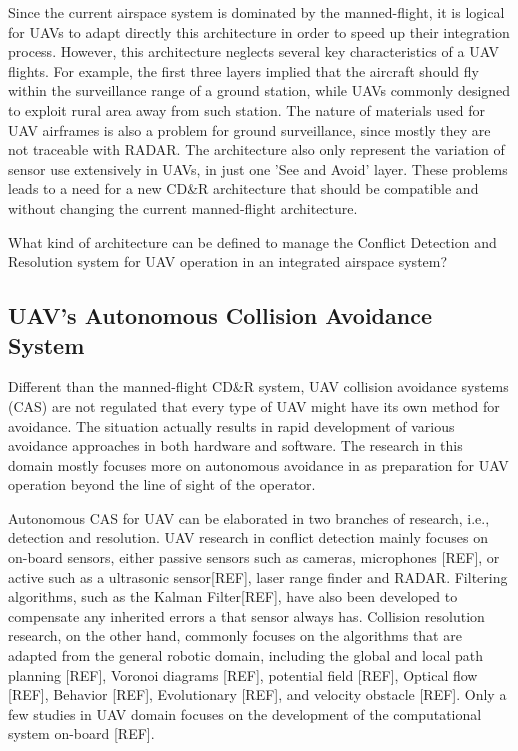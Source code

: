 Since the current airspace system is dominated by the manned-flight, it is logical for UAVs to adapt directly this architecture in order to speed up their integration process. However, this architecture neglects several key characteristics of a UAV flights. For example, the first three layers implied that the aircraft should fly within the surveillance range of a ground station, while UAVs commonly designed to exploit rural area away from such station. The nature of materials used for UAV airframes is also a problem for ground surveillance, since mostly they are not traceable with RADAR. The architecture also only represent the variation of sensor use extensively in UAVs, in just one 'See and Avoid' layer. These problems leads to a need for a new CD\&R architecture that should be compatible and without changing the current manned-flight architecture.
\begin{tcolorbox}[colback=blue!5,colframe=blue!70!black,sharp corners=all,enlarge left by=5mm,width=120mm,title=\textbf{Problem 1}]
What kind of architecture can be defined to manage the Conflict Detection and Resolution system for UAV operation in an integrated airspace system? %
\end{tcolorbox}



\subsection{UAV's Autonomous Collision Avoidance System}
Different than the manned-flight CD\&R system, UAV collision avoidance systems (CAS) are not regulated that every type of UAV might have its own method for avoidance. The situation actually results in rapid development of various avoidance approaches in both hardware and software. The research in this domain mostly focuses more on autonomous avoidance in as preparation for UAV operation beyond the line of sight of the operator.

Autonomous CAS for UAV can be elaborated in two branches of research, i.e., detection and resolution. UAV research in conflict detection mainly focuses on on-board sensors, either passive sensors such as cameras\cite{Fasano:08}, microphones [REF], or active such as a ultrasonic sensor[REF], laser range finder\cite{Hrabar:11} and RADAR\cite{Moses:14}. Filtering algorithms, such as the Kalman Filter[REF], have also been developed to compensate any inherited errors a that sensor always has. Collision resolution research, on the other hand, commonly focuses on the algorithms that are adapted from the general robotic domain, including the global and local path planning [REF], Voronoi diagrams [REF], potential field [REF], Optical flow [REF], Behavior [REF], Evolutionary [REF], and velocity obstacle [REF]. Only a few studies in UAV domain focuses on the development of the computational system on-board [REF].

